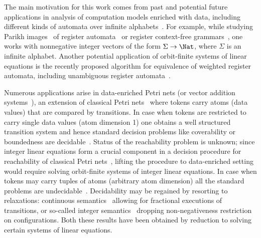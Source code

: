 The main motivation for this work comes from past and potential future applications in analysis of computation models 
enriched with data, including different kinds of automata over infinite alphabets~\cite{NSV04,KF94,lmcs14}. 
For example, while studying Parikh images~\cite{HJLP21} of register automata~\cite{KF94} or 
register context-free grammars~\cite{lmcs14,atombook,CL15-csl}, one works with nonnegative integer vectors of the form
$\Sigma\to\Nat$, where $\Sigma$ is an infinite alphabet.
Another potential application of orbit-finite systems of linear equations 
is the recently proposed algorithm for equivalence of 
weighted register automata, including unambiguous register automata~\cite{BKM21}.

Numerous applications arise in
data-enriched Petri nets \cite{Nets-with-Tokens-which-Carry-Data,Lasota16} 
(or vector addition systems~\cite{Coverability-Trees-for-Petri-Nets-with-Unordered-Data}), 
an extension of classical Petri nets~\cite{SilvaTC96} 
where tokens carry atoms (data values) that are compared by transitions.
In case when tokens are restricted to carry single data values (atom dimension 1)
one obtains a well structured transition system and
hence standard decision problems like coverability or boundedness are 
decidable~\cite{Nets-with-Tokens-which-Carry-Data,Coverability-Trees-for-Petri-Nets-with-Unordered-Data,What-Makes-Petri-Nets-Harder-to-Verify-Stack-or-Data,Lasota16}. %
Status of the reachability problem is unknown;
since integer linear equations form a crucial component in a decision procedure for reachability of classical Petri
nets~\cite{Mayr81,Kosaraju82,Lambert92,LerouxS15}, 
lifting the procedure to data-enriched setting would require solving orbit-finite systems of integer linear equations.
In case when tokens may carry tuples of atoms (arbitrary atom dimension) all the standard problems are undecidable~\cite{Lasota16}. 
Decidability may be regained by resorting to relaxations: %
continuous semantics~\cite{DBLP:conf/fossacs/GuptaSAH19} allowing for fractional executions of transitions, 
or so-called integer semantics~\cite{DBLP:conf/lics/HofmanLT17} dropping non-negativeness restriction on configurations.
Both these results have been obtained by reduction to solving certain systems of linear equations. 
%


